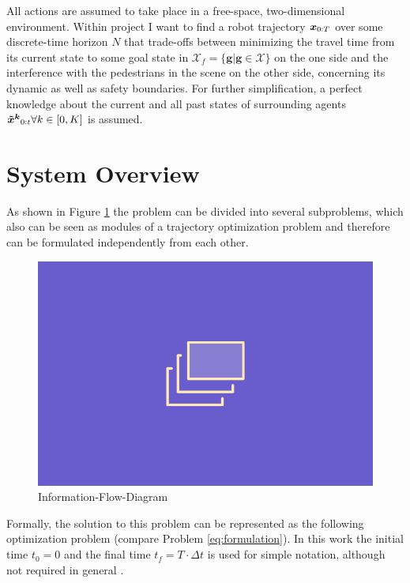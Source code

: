 All actions are assumed to take place in a free-space, two-dimensional environment. 
\newline
Within project \project I want to find a robot trajectory $\boldsymbol{x}_{0:T}$ over some discrete-time horizon $N$ that trade-offs between minimizing the travel time from its current state to some goal state in $\mathcal{X}_f = \{\boldsymbol{g} | \boldsymbol{g} \in \mathcal{X} \}$ on the one side and the interference with the pedestrians in the scene on the other side, concerning its dynamic as well as safety boundaries. For further simplification, a perfect knowledge about the current and all past states of surrounding agents $\xped[k]_{0:t} \forall k \in [0, K]$ is assumed. 

\section{System Overview}
\label{text:approach/overview}
As shown in Figure \ref{img:information_flow} the problem can be divided into several subproblems, which also can be seen as modules of a trajectory optimization problem and therefore can be formulated independently from each other. 

\begin{figure}[!ht]
\begin{center}
\includegraphics[width=\imgwidth]{images/placeholder.png}
\caption{Information-Flow-Diagram}
\label{img:information_flow}
\end{center}
\end{figure}

Formally, the solution to this problem can be represented as the following optimization problem (compare Problem \ref{eq:formulation}). In this work the initial time $t_0 = 0$ and the final time $t_f = T \cdot \Delta t$ is used for simple notation, although not required in general \cite{Wachter2006}. \\

